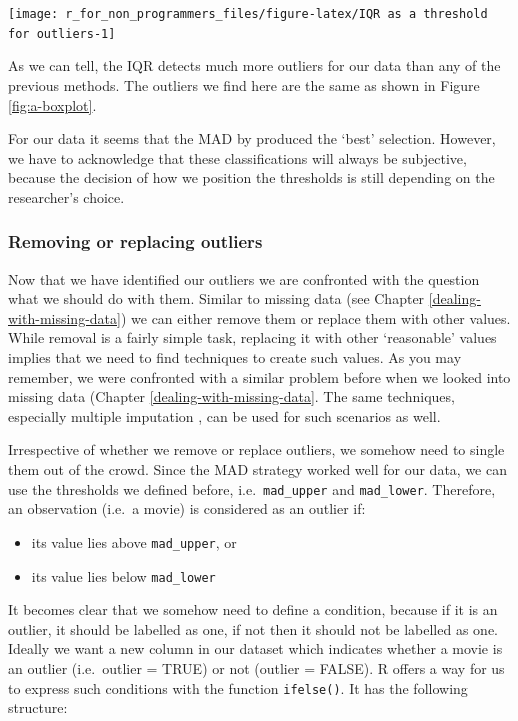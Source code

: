\documentclass[
]{book}
\begin{document}
\begin{center}\texttt{[image: r\_for\_non\_programmers\_files/figure-latex/IQR as a threshold for outliers-1]} \end{center}

As we can tell, the IQR detects much more outliers for our data than any of the previous methods. The outliers we find here are the same as shown in Figure \ref{fig:a-boxplot}.

For our data it seems that the MAD by \citet{leys2013detecting} produced the `best' selection. However, we have to acknowledge that these classifications will always be subjective, because the decision of how we position the thresholds is still depending on the researcher's choice.

\hypertarget{removing-or-replacing-outliers}{%
\subsubsection{Removing or replacing outliers}\label{removing-or-replacing-outliers}}

Now that we have identified our outliers we are confronted with the question what we should do with them. Similar to missing data (see Chapter \ref{dealing-with-missing-data}) we can either remove them or replace them with other values. While removal is a fairly simple task, replacing it with other `reasonable' values implies that we need to find techniques to create such values. As you may remember, we were confronted with a similar problem before when we looked into missing data (Chapter \ref{dealing-with-missing-data}. The same techniques, especially multiple imputation \citep[see][]{cousineau2010outliers}, can be used for such scenarios as well.

Irrespective of whether we remove or replace outliers, we somehow need to single them out of the crowd. Since the MAD strategy worked well for our data, we can use the thresholds we defined before, i.e.~\texttt{mad\_upper} and \texttt{mad\_lower}. Therefore, an observation (i.e.~a movie) is considered as an outlier if:

\begin{itemize}
\item
  its value lies above \texttt{mad\_upper}, or
\item
  its value lies below \texttt{mad\_lower}
\end{itemize}

It becomes clear that we somehow need to define a condition, because if it is an outlier, it should be labelled as one, if not then it should not be labelled as one. Ideally we want a new column in our dataset which indicates whether a movie is an outlier (i.e.~outlier = TRUE) or not (outlier = FALSE). R offers a way for us to express such conditions with the function \texttt{ifelse()}. It has the following structure:
\end{document}
